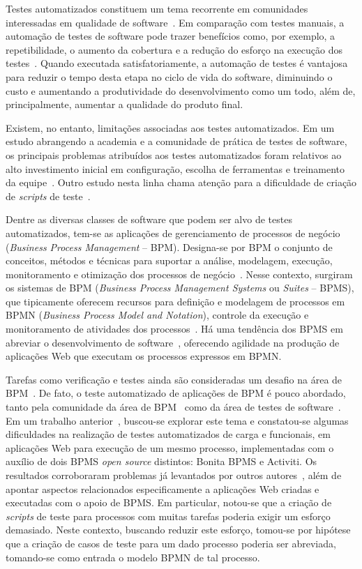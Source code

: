 \documentclass[12pt]{article}
\begin{document}
Testes automatizados constituem um tema recorrente em comunidades interessadas em qualidade de software~\cite{Delamaro:2007, Dustin:2009}. Em comparação com testes manuais, a automação de testes de software pode trazer benefícios como, por exemplo, a repetibilidade, o aumento da cobertura e a redução do esforço na execução dos testes~\cite{Rafi:2012, sbqs2015:compara}. 
Quando executada satisfatoriamente, a automação de testes é vantajosa para reduzir o tempo desta etapa no ciclo de vida do software, diminuindo o custo e aumentando a produtividade do desenvolvimento como um todo, além de, principalmente, aumentar a qualidade do produto final.

Existem, no entanto, limitações associadas aos testes automatizados. Em um estudo abrangendo a academia e a comunidade de prática de testes de software, os principais problemas atribuídos aos testes automatizados foram relativos ao alto investimento inicial em configuração, escolha de ferramentas e treinamento da equipe~\cite{Rafi:2012}. Outro estudo nesta linha chama atenção para a dificuldade de criação de \emph{scripts} de teste~\cite{Wiklund:2014}.

Dentre as diversas classes de software que podem ser alvo de testes automatizados, tem-se as aplicações de gerenciamento de processos de negócio (\emph{Business Process Management} -- BPM). Designa-se por BPM o conjunto de conceitos, métodos e técnicas para suportar a análise, modelagem, execução, monitoramento e otimização dos processos de negócio~\cite{weske}. Nesse contexto, surgiram os sistemas de BPM (\emph{Business Process Management Systems} ou \emph{Suites} -- BPMS), que tipicamente oferecem  recursos para definição e modelagem de processos em BPMN (\emph{Business Process Model and Notation}), controle da execução e monitoramento de atividades dos processos~\cite{forrester}. Há uma tendência dos BPMS em abreviar o desenvolvimento de software~\cite{greenresearch}, oferecendo agilidade na produção de aplicações Web que executam os processos expressos em BPMN. 

Tarefas como verificação e testes ainda são consideradas um desafio na área de BPM~\cite{aalst2013survey}. De fato, o teste automatizado de aplicações de BPM é pouco abordado, tanto pela comunidade da área de BPM~\cite{weske} como da área de testes de software~\cite{graham2012experiences}. Em um trabalho anterior~\cite{sbqs2015}, buscou-se explorar este tema e constatou-se algumas dificuldades na realização de testes automatizados de carga e funcionais, em aplicações Web para execução de um mesmo processo, implementadas com o auxílio de dois BPMS \emph{open source} distintos: Bonita BPMS e Activiti. Os resultados corroboraram problemas já levantados por outros autores~\cite{Rafi:2012, Wiklund:2014}, além de apontar aspectos relacionados especificamente a aplicações Web criadas e executadas com o apoio de BPMS. Em particular, notou-se que a criação de \emph{scripts} de teste para processos com muitas tarefas poderia exigir um esforço demasiado. Neste contexto, buscando reduzir este esforço, tomou-se por hipótese que a criação de casos de teste para um dado processo poderia ser abreviada, tomando-se como entrada o modelo BPMN de tal processo. 
\end{document}
